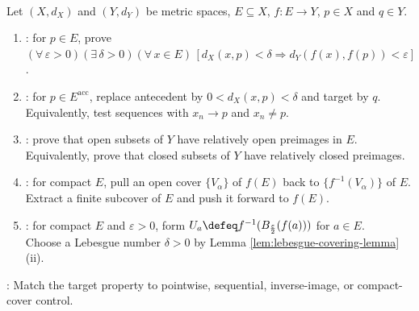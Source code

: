 \begin{proofmethod} \label{meth:continuity-proof-patterns} \\
Let $(X,d_X)$ and $(Y,d_Y)$ be metric spaces, $E\subseteq X$, $f:E\to Y$, $p\in X$ and $q\in Y$.
\begin{enumerate}[label=(\roman*)]
\setlength{\itemsep}{0pt}
\item {}: for $p\in E$, prove $(\forall\,\varepsilon>0)(\exists\,\delta>0)(\forall\,x\in E)\,[d_X(x,p)<\delta\Longrightarrow d_Y(f(x),f(p))<\varepsilon]$.
\item {}: for $p\in E^{\operatorname{acc}}$, replace antecedent by $0<d_X(x,p)<\delta$ and target by $q$.\\
Equivalently, test sequences with $x_n\to p$ and $x_n\neq p$.
\item {}: prove that open subsets of $Y$ have relatively open preimages in $E$.\\
Equivalently, prove that closed subsets of $Y$ have relatively closed preimages.
\item {}: for compact $E$, pull an open cover $\{V_\alpha\}$ of $f(E)$ back to $\{f^{-1}(V_\alpha)\}$ of $E$.\\
Extract a finite subcover of $E$ and push it forward to $f(E)$.
\item {}: for compact $E$ and $\varepsilon>0$, form $U_a\defeq f^{-1}(B_{\frac{\varepsilon}{2}}(f(a)))$ for $a\in E$.\\
Choose a Lebesgue number $\delta>0$ by Lemma \ref{lem:lebesgue-covering-lemma}(ii).
\end{enumerate}
: Match the target property to pointwise, sequential, inverse-image, or compact-cover control.
\end{proofmethod}

